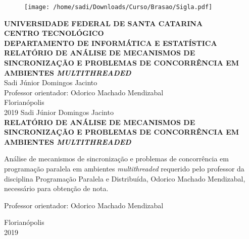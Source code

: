 \documentclass[12pt,a4paper,brazil,abntex2]{article}
\begin{document}
\singlespacing
\begin{titlepage}
\begin{center}
\begin{figure}[!htb]
\center

\texttt{[image: /home/sadi/Downloads/Curso/Brasao/Sigla.pdf]} 

\end{figure}
{\bf  UNIVERSIDADE FEDERAL DE SANTA CATARINA}\\[0.2cm]
{\bf CENTRO TECNOLÓGICO}\\[0.2cm]
{\bf  DEPARTAMENTO DE INFORMÁTICA E ESTATÍSTICA}\\[5.5cm]
{\bf \large RELATÓRIO DE ANÁLISE DE MECANISMOS DE SINCRONIZAÇÃO E PROBLEMAS DE CONCORRÊNCIA EM AMBIENTES \textit{MULTITHREADED}}\\[3.6 cm]
{Sadi Júnior Domingos Jacinto}\\[1cm]
{Professor orientador: Odorico Machado Mendizabal}\\[4.1 cm]
{Florianópolis}\\[0.2cm]
{2019}
\newpage
\thispagestyle{empty}
{Sadi Júnior Domingos Jacinto}\\[9cm]
{\bf \large RELATÓRIO DE ANÁLISE DE MECANISMOS DE SINCRONIZAÇÃO E PROBLEMAS DE CONCORRÊNCIA EM AMBIENTES \textit{MULTITHREADED}}\\[0.5cm]
    \begin{flushright}
    \begin{list}{}{
      \setlength{\leftmargin}{7.2cm}
      \setlength{\rightmargin}{0cm}
      \setlength{\labelwidth}{0pt}
      \setlength{\labelsep}{\leftmargin}}
      \item Análise de mecanismos de sincronização e problemas de concorrência em programação paralela em ambientes \textit{multithreaded} requerido pelo professor da disciplina Programação Paralela e Distribuída, Odorico Machado Mendizabal, necessário para obtenção de nota.\\[0.2 cm] 
      \setlength{\labelsep}{\leftmargin}
      \item Professor orientador: Odorico Machado Mendizabal\
      \\[7.5cm]
     \end{list}
	 \end{flushright}
{Florianópolis}\\[0.2cm]
{2019}
\end{center}
\end{titlepage} %

\newpage
\thispagestyle{empty}
\begin{center}
\tableofcontents
\end{center}


\end{document}
